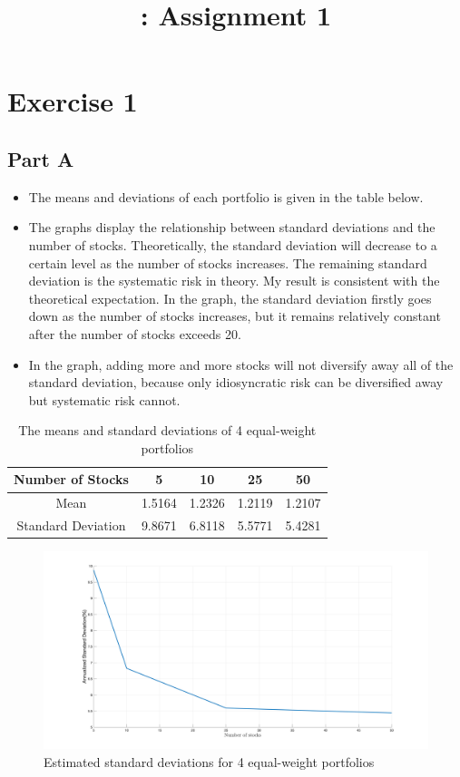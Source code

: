 \documentclass{report}
\title{\LectureTitle: Assignment 1}
\begin{document}
\maketitle
\newpage

\section{Exercise 1}
\subsection{Part A}
\begin{itemize}
	\item The means and deviations of each portfolio is given in the table below.
	\item The graphs display the relationship between standard deviations and the number of stocks. Theoretically, the standard deviation will decrease to a certain level as the number of stocks increases. The remaining standard deviation is the systematic risk in theory. My result is consistent with the theoretical expectation. In the graph, the standard deviation firstly goes down as the number of stocks increases, but it remains relatively constant after the number of stocks exceeds 20.
	\item In the graph, adding more and more stocks will not diversify away all of the standard deviation, because only idiosyncratic risk can be diversified away but systematic risk cannot.
\end{itemize}
\begin{table}[H]
	\centering
	\caption{The means and standard deviations of 4 equal-weight portfolios}
	\begin{tabular}{ccccc}\hline\hline
	Number of Stocks & 5 & 10 & 25 & 50 \\\hline
	Mean & 1.5164 & 1.2326 & 1.2119 & 1.2107 \\
	Standard Deviation & 9.8671 & 6.8118 & 5.5771 & 5.4281 \\ \hline
	\end{tabular}
\end{table}

\begin{figure}[H]
	\centering
	\includegraphics[width=1.0\textwidth]{figures/1A_sample}
	\caption{Estimated standard deviations for 4 equal-weight portfolios}
\end{figure}
\end{document}
